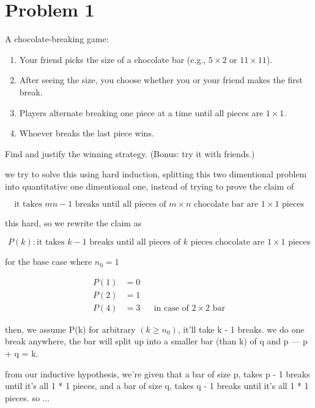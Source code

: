 \newcommand{\hmwkTitle}{Homework 3}
\newcommand{\hmwkDueDate}{Saturday, January 30, 2016}
\newcommand{\hmwkHeaderTitle}{ICCS206 Discrete Mathematic: Homework 3}


\section*{Problem 1}
A chocolate-breaking game:
\begin{enumerate}[label=\arabic*.]
    \item Your friend picks the size of a chocolate bar (e.g., $5 \times 2$ or $11 \times 11$).
    \item After seeing the size, you choose whether you or your friend makes the first break.
    \item Players alternate breaking one piece at a time until all pieces are $1 \times 1$.
    \item Whoever breaks the last piece wins.
\end{enumerate}
Find and justify the winning strategy. (Bonus: try it with friends.)

\medskip
\solution

we try to solve this using hard induction, splitting this two dimentional
problem into quantitative one dimentional one, instead of trying to prove
the claim of

\[
\text{it takes } mn - 1 \text{ breaks until all pieces of } m \times n
\text{ chocolate bar are } 1 \times 1 \text{ pieces}
\]

this hard, so we rewrite the claim as

\[
P(k) : \text{it takes } k - 1 \text{ breaks until all pieces of } k
\text{ pieces chocolate are } 1 \times 1 \text{ pieces}
\]

for the base case where $n_0 = 1$

\[
\begin{aligned}
P(1) &= 0 \\
P(2) &= 1 \\
P(4) &= 3 && \text{in case of } 2 \times 2 \text{ bar}
\end{aligned}
\]

then, we assume P(k) for arbitrary $(k \ge n_0)$, it'll take k - 1 breaks.
we do one break anywhere, the bar will split up into a smaller bar (than k)
of q and p --- p + q = k.

\vspace{1em}

from our inductive hypothesis, we're given that a bar of size p, takes p - 1
breaks until it's all 1 * 1 pieces, and a bar of size q, takes q - 1 breaks
until it's all 1 * 1 pieces. so ...

